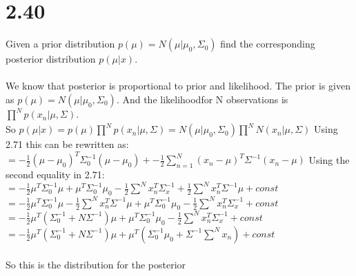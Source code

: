 \documentclass[11pt,leqno,fleqn]{article}
\begin{document}
\section{2.40}

Given a prior distribution $p(\mu) = N(\mu|\mu_0,\Sigma_0)$ find the corresponding posterior distribution $p(\mu|x)$.\\
\\
We know that posterior is proportional to prior and likelihood. The prior is given as $p(\mu) = N(\mu|\mu_0,\Sigma_0)$. And the likelihoodfor N observations is $\prod\limits_{}^N p(x_n| \mu, \Sigma). $ \\
So $p(\mu|x) =  p(\mu) \prod\limits_{}^N   p(x_n| \mu, \Sigma) =  N(\mu|\mu_0,\Sigma_0) \prod\limits_{}^N  N(x_n| \mu, \Sigma)$
Using 2.71 this can be rewritten as:\\
$= - \frac{1}{2} (\mu - \mu_0)^T \Sigma_0^{-1} (\mu - \mu_0) +- \frac{1}{2} \sum\limits_{n = 1}^N  (x_n - \mu)^T \Sigma^{-1}  (x_n - \mu) $
Using the second equality in 2.71:\\
$= - \frac{1}{2} \mu^T \Sigma_0^{-1} \mu + \mu^T \Sigma_0^{-1} \mu_0 - \frac{1}{2} \sum\limits_{}^N x_n^T \Sigma_x^{-1} +  \frac{1}{2} \sum\limits_{}^N  x_n^T  \Sigma^{-1} \mu + const$\\
$= - \frac{1}{2} \mu^T \Sigma_0^{-1} \mu -   \frac{1}{2} \sum\limits_{}^N  x_n^T  \Sigma^{-1} \mu +  \mu^T \Sigma_0^{-1} \mu_0 - \frac{1}{2} \sum\limits_{}^N x_n^T \Sigma_x^{-1} + const $\\
$= - \frac{1}{2} \mu^T( \Sigma_0^{-1} + N\Sigma^{-1}) \mu +  \mu^T \Sigma_0^{-1} \mu_0 - \frac{1}{2} \sum\limits_{}^N x_n^T \Sigma_x^{-1} + const$\\
$= - \frac{1}{2} \mu^T( \Sigma_0^{-1} + N\Sigma^{-1}) \mu +  \mu^T(\Sigma_0^{-1} \mu_0 + \Sigma^{-1} \sum\limits_{}^N x_n) + const$\\
\\
So this is the distribution for the posterior
\end{document}
